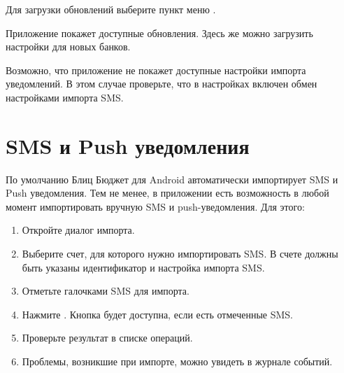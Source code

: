 \documentclass[a4paper,10pt,russian]{sphinxmanual}
\begin{document}
\noindent{}
\noindent{}
\noindent{}

Для загрузки обновлений выберите пункт меню .

\noindent{}
\noindent{}
\noindent{}

Приложение покажет доступные обновления. Здесь же можно загрузить настройки для новых банков.

\noindent{}
\noindent{}
\noindent{}
\noindent{}

Возможно, что приложение не покажет доступные настройки импорта уведомлений. В этом случае проверьте, что
в настройках включен обмен настройками импорта SMS.


\section{SMS и Push уведомления}
\label{\detokenize{import:sms-push}}
По умолчанию Блиц Бюджет для Android автоматически импортирует SMS и Push уведомления. Тем не менее, в приложении есть возможность
в любой момент импортировать вручную SMS и push-уведомления. Для этого:
\begin{enumerate}
\def\theenumi{\arabic{enumi}}
\def\labelenumi{\theenumi .}
\makeatletter\def\p@enumii{\p@enumi \theenumi .}\makeatother
\item {} 
Откройте диалог импорта.

\item {} 
Выберите счет, для которого нужно импортировать SMS. В счете должны быть указаны идентификатор и настройка импорта SMS.

\item {} 
Отметьте галочками SMS для импорта.

\item {} 
Нажмите . Кнопка будет доступна, если есть отмеченные SMS.

\item {} 
Проверьте результат в списке операций.

\item {} 
Проблемы, возникшие при импорте, можно увидеть в журнале событий.

\end{enumerate}
\end{document}
